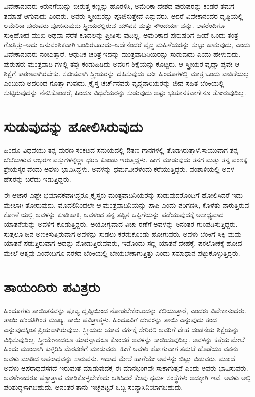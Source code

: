 ವಿವೇಕಾನಂದರು ಕಿರುನಗೆಯನ್ನು ಬೀರುತ್ತ ಕಣ್ಣನ್ನು ಹೊರಳಿಸಿ, ಅಮೆರಿಕಾ ದೇಶದ ಪುರುಷರನ್ನು ಕಂಡರೆ ತಮಗೆ ತಮಾಷೆ ಆಗುವುದು ಎಂದರು. ಅವರು ಸ್ತ್ರೀಯರನ್ನು ಪೂಜಿಸುತ್ತೇವೆ ಎನ್ನುವರು. ಅದರೆ ವಿವೇಕಾನಂದರ ದೃಷ್ಟಿಯಲ್ಲಿ ಅಮೆರಿಕಾ ಪುರುಷರು ಪೂಜಿಸುವುದು ಸ್ತ್ರೀಯರಲ್ಲಿರುವ ಯೌವನ ಮತ್ತು ಸೌಂದರ್ಯ ವನ್ನು. ಅವರೆಂದಿಗೂ ಸುಕ್ಕಿಹೋದ ಮುಖ ಅಥವಾ ನೆರೆತ ಕೂದಲನ್ನು ಪ್ರೀತಿಸು ವುದಿಲ್ಲ. ಅಮೆರಿಕಾದ ಪುರುಷರಿಗೆ ಹಿಂದೆ ಒಂದು ತಂತ್ರ ಗೊತ್ತಿತ್ತು–ಅದು ಆನುವಂಶಿಕವಾಗಿ ಬಂದಿರಬಹುದು–ಅದೇನೆಂದರೆ ವೃದ್ಧ ಮಹಿಳೆಯರನ್ನು ಸುಟ್ಟು ಹಾಕುವುದು, ಎಂದು ವಿವೇಕಾನಂದರು ನಂಬುತ್ತಾರೆ. ಆಧುನಿಕ ಚರಿತ್ರೆ ಇದನ್ನು ಮಂತ್ರವಾದಿನಿಯರನ್ನು ಸುಡುವುದು ಎಂದು ಹೇಳುವುದು. ಪುರುಷರು ಮಂತ್ರವಾದಿ ಗಳಲ್ಲಿ ತಪ್ಪು ಕಂಡುಹಿಡಿದು ಅವರಿಗೆ ಶಿಕ್ಷೆಯನ್ನು ಕೊಟ್ಟರು. ಆ ಸ್ತ್ರೀಯರ ವೃದ್ಧಾ ಪ್ಯವೇ ಆ ಶಿಕ್ಷೆಗೆ ಕಾರಣವಾಗಿರಬೇಕು. ಸಜೀವವಾಗಿ ಸ್ತ್ರೀಯರನ್ನು ದಹಿಸುವುದು ಬರೀ ಹಿಂದೂಗಳಲ್ಲಿ ಮಾತ್ರ ಒಂದು ವಾಡಿಕೆಯಲ್ಲ ಎಂಬುದು ಅದರಿಂದ ಗೊತ್ತಾ ಗುವುದು. ಕ್ರೈಸ್ತ ಚರ್ಚ್​ನವರು ವೃದ್ಧನಾರಿಯರನ್ನು ಜೀವ ಸಹಿತ ಬೆಂಕಿಯಲ್ಲಿ ಸುಟ್ಟಿರುವುದನ್ನು ನೆನಸಿಕೊಂಡರೆ, ಹಿಂದೂ ವಿಧವೆಯರನ್ನು ಸುಡುವುದು ಅಷ್ಟು ಭಯಾನಕವಾಗೇನೂ ತೋರುವುದಿಲ್ಲ.


\section{ಸುಡುವುದನ್ನು ಹೋಲಿಸಿರುವುದು}

ಹಿಂದೂ ವಿಧವೆಯು ತನ್ನ ಮರಣ ಸಂಕಟದ ಸಮಯದಲ್ಲಿ ಔತಣ ಗಾನಗಳಲ್ಲಿ ತೊಡಗಿರುತ್ತಾಳೆ.ಸಾಯುವಾಗ ತನ್ನ ಬೆಲೆಬಾಳುವ ಆಭರಣ ವಸ್ತುಗಳನ್ನೆಲ್ಲಾ ಧರಿಸಿ ಕೊಂಡು ಇರುತ್ತಿದ್ದಳು. ಹೀಗೆ ಮಾಡುವುದು ತನಗೆ ಮತ್ತು ತನ್ನ ವಂಶಕ್ಕೆ ಶ್ರೇಯಸ್ಕರ ವೆಂದು ಅವಳು ಭಾವಿಸಿದ್ದಳು. ಅವಳನ್ನು ಧರ್ಮವೀರಳೆಂದು ಕರೆಯುತ್ತಿದ್ದರು. ವಂಶಾಳಿಯಲ್ಲಿ ಅವಳ ಹೆಸರನ್ನು ಬರೆದು ಇಡುತ್ತಿದ್ದರು.

ಈ ಆಚಾರ ಎಷ್ಟೇ ಭಯಾನಕವಾಗಿದ್ದರೂ ಕ್ರೈಸ್ತರು ಮಂತ್ರವಾದಿನಿಯರನ್ನು ಸುಡುವುದರೊಂದಿಗೆ ಹೋಲಿಸಿದರೆ ಇದು ಮೇಲಾಗಿ ತೋರುವುದು. ಮೊದಲಿನಿಂದಲೇ ಆ ಮಂತ್ರವಾದಿನಿಯನ್ನು ಪಾಪಿ ಎಂದು ಪರಿಗಣಿಸಿ, ಕೊಳೆತು ನಾರುತ್ತಿರುವ ಕೋಣೆ ಯಲ್ಲಿ ಅವಳನ್ನು ಕೂಡಿಹಾಕಿ, ಅವಳಿಂದ ತನ್ನ ತಪ್ಪಿನ ಒಪ್ಪಿಗೆಯನ್ನು ಪಡೆಯುವುದಕ್ಕೆ ಅಸಾಧ್ಯವಾದ ಯಾತನೆಯನ್ನು ಅವಳಿಗೆ ಕೊಡುತ್ತಿದ್ದರು. ಅಯೋಗ್ಯವಾದ ವಿಚಾ ರಣೆಗೆ ಅವಳನ್ನು ಅನಂತರ ಗುರಿಪಡಿಸುತ್ತಿದ್ದರು. ಸುತ್ತಲೂ ಜನ ಅಣಕಿಸುತ್ತಿರುವಾಗ ಅವಳನ್ನು ಸುಡಲು ಕರೆದುಕೊಂಡು ಹೋಗುವರು. ಅವಳು ಬೆಂಕಿಗೆ ಸಿಕ್ಕಿ ಯಮ ಯಾತನೆ ಪಡುತ್ತಿರುವಾಗ ಅದನ್ನು ನೋಡುತ್ತಿರುವವರು, ಇದೊಂದು ಸಣ್ಣ ಯಾತನೆ ದೇಹಕ್ಕೆ, ಪರಲೋಕಕ್ಕೆ ಹೋದ ಮೇಲೆ ಆತ್ಮವು ಎಂದೆಂದಿಗೂ ನರಕದ ಬೆಂಕಿಯಲ್ಲಿ ಬೇಯಬೇಕಾಗುತ್ತಿತ್ತು ಎಂದು ಸಮಾಧಾನ ಪಟ್ಟುಕೊಳ್ಳುತ್ತಿದ್ದರು.

\delimiter


\section{ತಾಯಂದಿರು ಪವಿತ್ರರು}

ಹಿಂದೂಗಳು ತಾಯಿತನವನ್ನು ಪೂಜ್ಯ ದೃಷ್ಟಿಯಿಂದ ನೋಡಬೇಕೆಂಬುದನ್ನು ಕಲಿಯುತ್ತಾರೆ, ಎಂದರು ವಿವೇಕಾನಂದರು. ತಾಯಿ ಹೆಂಡತಿಗಿಂತ ಮುಖ್ಯ. ತಾಯಿ ಪವಿತ್ರಾತ್ಮಳು. ಹಿಂದೂವಿಗೆ ದೇವರನ್ನು ತಾಯಿ ಎನ್ನುವುದು ತಂದೆ ಎನ್ನುವುದಕ್ಕಿಂತ ಪ್ರಿಯವಾಗಿರುವುದು. ಸ್ತ್ರೀಯರು ಯಾವ ವರ್ಗಕ್ಕೆ ಸೇರಿರಲಿ ಅವರಿಗೆ ದೇಹ ದಂಡನೆಯ ಶಿಕ್ಷೆಯನ್ನು ವಿಧಿಸುವುದಿಲ್ಲ. ಸ್ತ್ರೀಯೇನಾದರೂ ಯಾರನ್ನಾದರೂ ಕೊಂದರೆ ಅವಳನ್ನು ಸಾಯಿಸುವುದಿಲ್ಲ. ಅವಳನ್ನು ಕತ್ತೆಯ ಮೇಲೆ ಹಿಂದು ಮುಂದಾಗಿ ಕುಳ್ಳಿರಿಸಿ ಮೆರವಣಿಗೆ ಮಾಡುವರು. ಹೀಗೆ ಅವಳು ಹೋಗುವಾಗ ತಮಟೆ ಹೊಡೆಯು ವವನು ಅವಳು ಮಾಡಿದ ಅಪರಾಧವನ್ನು ಸಾರುವನು. ಇದಾದ ಮೇಲೆ ಹಾಗೆಯೇ ಅವಳನ್ನು ಬಿಟ್ಟು ಬಿಡುವರು. ಮುಂದೆ ಅವಳು ಅಪರಾಧವೆಸಗದೆ ಇರುವಂತೆ ಮಾಡುವುದಕ್ಕೆ ಈ ಮಾನಭಂಗವೇ ಸಾಕಾಗುತ್ತದೆ ಎಂದು ಅವರು ಭಾವಿಸುವರು. ಅವಳೇನಾದರೂ ಪಶ್ಚಾತ್ತಾಪ ಮಾಡಿಕೊಳ್ಳಬೇಕೆಂದು ಆಶಿಸಿದರೆ ಕೆಲವು ಧರ್ಮ ಸಂಸ್ಥೆಗಳು ಅದಕ್ಕಾಗಿ ಇವೆ. ಅವಳು ಅಲ್ಲಿ ಪರಿಶುದ್ಧಳಾಗಬಹುದು. ಅನಂತರ ತಾನು ಇಚ್ಛೆಪಟ್ಟರೆ ಒಬ್ಬ ಸಂನ್ಯಾಸಿನಿಯಾಗಬಹುದು.

